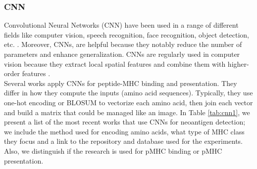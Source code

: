 \subsubsection{CNN}

Convolutional Neural Networks (CNN) have been used in a range of different fields like computer vision, speech recognition, face recognition, object detection, etc. \cite{alzubaidi2021review}. Moreover, CNNs, are helpful because they notably reduce the number of parameters and enhance generalization. CNNs are regularly used in computer vision because they extract local spatial features and combine them with higher-order features \cite{marais2020leveraging}.\\

Several works apply CNNs for peptide-MHC binding and presentation. They differ in how they compute the inputs (amino acid sequences). Typically, they use one-hot encoding or BLOSUM to vectorize each amino acid, then join each vector and build a matrix that could be managed like an image. In Table \ref{tab:cnn1}, we present a list of the most recent works that use CNNs for neoantigen detection; we include the method used for encoding amino acids, what type of MHC class they focus and a link to the repository and database used for the experiments. Also, we distinguish if the research is used for pMHC binding or pMHC presentation. \\



